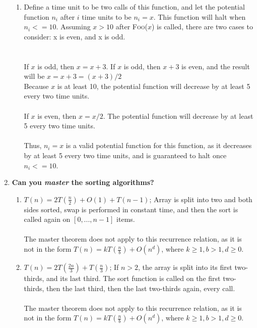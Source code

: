 \documentclass{article}
\begin{document}
\begin{enumerate}
\begin{enumerate}
        \item Define a time unit to be two calls of this function, and let the potential function $n_i$ after $i$ time units to be $n_i = x$. This function will halt when $n_i <= 10$. Assuming $x > 10$ after \textsc{Foo}($x$) is called, there are two cases to consider: x is even, and x is odd. \\
        \\\\
        If $x$ is odd, then $x=x+3$. If $x$ is odd, then $x+3$ is even, and the result will be $x=x+3=(x+3)/2$ \\
        Because $x$ is at least 10, the potential function will decrease by at least 5 every two time units.
        \\\\
        If $x$ is even, then $x=x/2$. The potential function will decrease by at least 5 every two time units.
        \\\\
        Thus, $n_i = x$ is a valid potential function for this function, as it decreases by at least 5 every two time units, and is guaranteed to halt once $n_i <= 10$.
    \end{enumerate}


    \item \textbf{Can you \textit{master} the sorting algorithms?}
    \begin{enumerate}
        \item $T(n) = 2T(\frac{n}{2}) + O(1) + T(n-1)$; Array is split into two and both sides sorted, swap is performed in constant time, and then the sort is called again on $[0, ..., n-1]$ items.
        \\\\
        The master theorem does not apply to this recurrence relation, as it is not in the form $T(n) = kT(\frac{n}{b}) + O(n^d)$, where $k \geq 1, b > 1, d \geq 0$.
        \item $T(n) = 2T(\frac{2n}{3}) + T(\frac{n}{3})$; If $n>2$, the array is split into its first two-thirds, and its last third. The sort function is called on the first two-thirds, then the last third, then the last two-thirds again, every call. 
        \\\\
        The master theorem does not apply to this recurrence relation, as it is not in the form $T(n) = kT(\frac{n}{b}) + O(n^d)$, where $k \geq 1, b > 1, d \geq 0$.
    \end{enumerate}


\end{enumerate}
\end{document}
